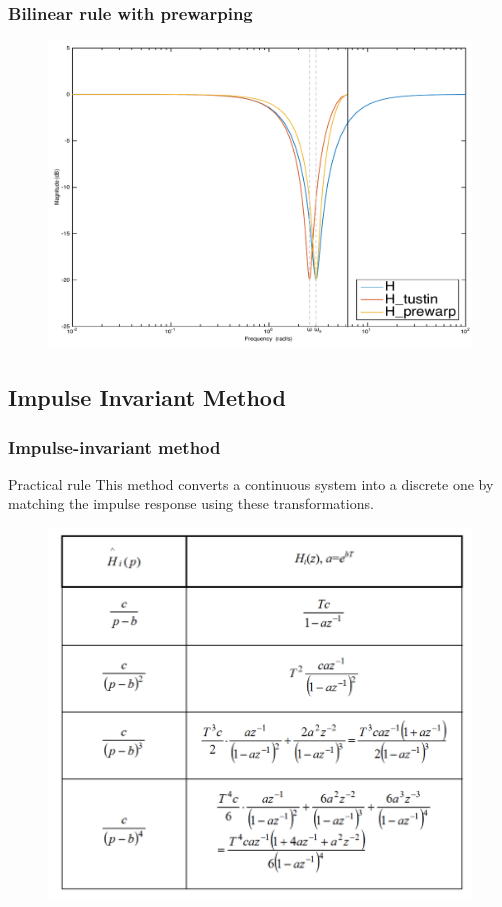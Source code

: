 \begin{frame}
	\frametitle{Bilinear rule with prewarping}
	\vspace{-0.5em}
	\begin{figure}
		\centering
		\includegraphics[width=0.8\linewidth]{Distortion_bode1}
	\end{figure}
\end{frame}

\subsection{Impulse Invariant Method}

\begin{frame}
	\frametitle{Impulse-invariant method}
	\begin{block}{Practical rule}
		This method converts a continuous system into a discrete one by matching the impulse response using these transformations.
		\vspace{-1em}
		\begin{figure}
			\centering
			\includegraphics[width=0.5\linewidth]{impuls_inv}
		\end{figure}
	\end{block}
\end{frame}
